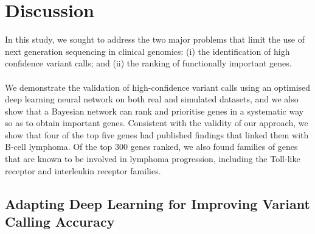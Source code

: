 \documentclass{article}
\begin{document}
\newpage
\section{Discussion}
In this study, we sought to address the two major problems that limit the use of next generation sequencing in clinical genomics: (i) the identification of high confidence variant calls; and (ii) the ranking of functionally important genes.\\\\
We demonstrate the validation of high-confidence variant calls using an optimised deep learning neural network on both real and simulated datasets, and we also show that a Bayesian network can rank and prioritise genes in a systematic way so as to obtain important genes. Consistent with the validity of our approach, we show that four of the top five genes had published findings that linked them with B-cell lymphoma. Of the top 300 genes ranked, we also found  families of genes that are known to be involved in lymphoma progression, including the Toll-like receptor and interleukin receptor families. 







\subsection{Adapting Deep Learning for Improving Variant Calling Accuracy}
\end{document}
